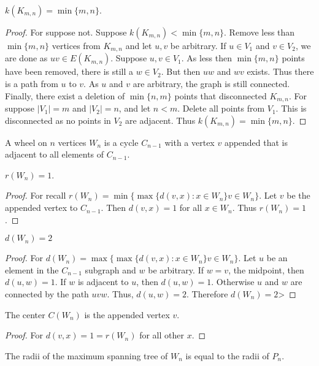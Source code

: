     \begin{theorem}
    $k(K_{m,n}) = \min\{m,n\}$.
    \end{theorem}
    \begin{proof}
    For suppose not. Suppose $k(K_{m,n})<\min\{m,n\}$. Remove less than $\min\{m,n\}$ vertices from $K_{m,n}$ and let $u,v$ be arbitrary. If $u\in V_1$ and $v\in V_2$, we are done as $uv\in E(K_{m,n})$. Suppose $u,v\in V_1$. As less then $\min\{m,n\}$ points have been removed, there is still a $w\in V_2$. But then $uw$ and $wv$ exists. Thus there is a path from $u$ to $v$. As $u$ and $v$ are arbitrary, the graph is still connected. Finally, there exist a deletion of $\min\{n,m\}$ points that disconnected $K_{m,n}$. For suppose $|V_1| = m$ and $|V_2| = n$, and let $n<m$. Delete all points from $V_1$. This is disconnected as no points in $V_2$ are adjacent. Thus $k(K_{m,n})=\min\{m,n\}$.
    \end{proof}
    \begin{definition}
    A wheel on $n$ vertices $W_n$ is a cycle $C_{n-1}$ with a vertex $v$ appended that is adjacent to all elements of $C_{n-1}$.
    \end{definition}
    \begin{theorem}
    $r(W_n) = 1$.
    \end{theorem}
    \begin{proof}
    For recall $r(W_n) = \min\{\max\{d(v,x):x\in W_n\}v\in W_n\}$. Let $v$ be the appended vertex to $C_{n-1}$. Then $d(v,x) = 1$ for all $x\in W_n$. Thus $r(W_n) = 1$.
    \end{proof}
    \begin{theorem}
    $d(W_n) = 2$
    \end{theorem}
    \begin{proof}
    For $d(W_n) = \max\{\max\{d(v,x):x\in W_n\}v\in W_n\}$. Let $u$ be an element in the $C_{n-1}$ subgraph and $w$ be arbitrary. If $w= v$, the midpoint, then $d(u,w) = 1$. If $w$ is adjacent to $u$, then $d(u,w) = 1$. Otherwise $u$ and $w$ are connected by the path $uvw$. Thus, $d(u,w) = 2$. Therefore $d(W_n) = 2$>
    \end{proof}
    \begin{theorem}
    The center $C(W_n)$ is the appended vertex $v$.
    \end{theorem}
    \begin{proof}
    For $d(v,x) = 1 = r(W_n)$ for all other $x$.
    \end{proof}
    \begin{theorem}
    The radii of the maximum spanning tree of $W_n$ is equal to the radii of $P_n$.
    \end{theorem}
